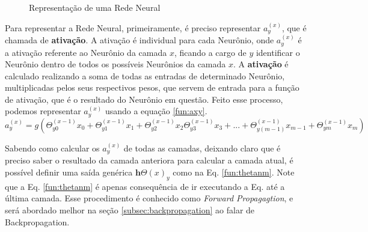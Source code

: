 \begin{figure}
\caption{Representação de uma Rede Neural}
\label{fg:rede_neural_generica}
\end{figure}


Para representar a Rede Neural, primeiramente, é preciso  representar $a^{(x)}_y$, que é chamada de \textbf{ativação}. A ativação é individual para cada Neurônio, onde $a^{(x)}_y$ é a ativação referente ao Neurônio da camada $x$, ficando a cargo de $y$ identificar o Neurônio dentro de todos os possíveis Neurônios da camada $x$. A \textbf{ativação} é calculado realizando a soma de todas as entradas de determinado Neurônio, multiplicadas pelos seus respectivos pesos, que servem de entrada para a função de ativação, que é o resultado do Neurônio em questão. Feito esse processo, podemos representar $a^{(x)}_y$ usando a equação \ref{fun:axy}.
\begin{equation}
    a^{(x)}_y=g(\Theta^{(x-1)}_{y0}x{}_0+\Theta^{(x-1)}_{y1}x{}_1+\Theta^{(x-1)}_{y2}x{}_2\Theta^{(x-1)}_{y3}x{}_3+...+\Theta^{(x-1)}_{y(m-1)}x{}_{m-1}+\Theta^{(x-1)}_{ym}x{}_m )
    \label{fun:axy}
\end{equation}


Sabendo como calcular os $a^{(x)}_y$ de todas as camadas, deixando claro que é preciso saber o resultado da camada anteriora para calcular a camada atual, é possível definir uma saída genérica $\mathbf{h}{\Theta}(x)_y$ como na  Eq. \ref{fun:thetanm}. Note que a Eq. \ref{fun:thetanm} é apenas consequência de ir executando a Eq.  \label{fun:axy} até a última camada. Esse procedimento é conhecido como \textit{Forward Propagagtion}, e será abordado melhor na seção \ref{subsec:backpropagation} ao falar de Backpropagation.

